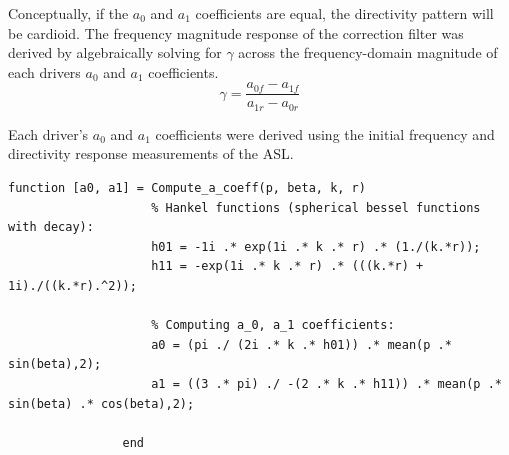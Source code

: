 \documentclass{report}
\begin{document}
            Conceptually, if the $a_0$ and $a_1$ coefficients are equal, the directivity pattern will be cardioid.
            The frequency magnitude response of the correction filter was derived by algebraically solving for $\gamma$ across the frequency-domain magnitude of each drivers $a_0$ and $a_1$ coefficients.
            \begin{equation}
                \gamma = \frac{a_{0f} - a_{1f}}{a_{1r} - a_{0r}}
            \end{equation}

            Each driver's $a_0$ and $a_1$ coefficients were derived using the initial frequency and directivity response measurements of the ASL.
            \begin{lstlisting}[style=Matlab-editor, gobble=16]
                function [a0, a1] = Compute_a_coeff(p, beta, k, r)
                    % Hankel functions (spherical bessel functions with decay):
                    h01 = -1i .* exp(1i .* k .* r) .* (1./(k.*r));
                    h11 = -exp(1i .* k .* r) .* (((k.*r) + 1i)./((k.*r).^2));

                    % Computing a_0, a_1 coefficients:
                    a0 = (pi ./ (2i .* k .* h01)) .* mean(p .* sin(beta),2);
                    a1 = ((3 .* pi) ./ -(2 .* k .* h11)) .* mean(p .* sin(beta) .* cos(beta),2);
                
                end
            \end{lstlisting}
        
\end{document}
